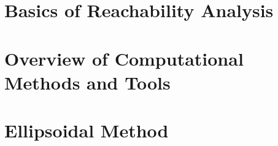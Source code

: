 \newcommand{\UX}{\underline{\XX}}
\newcommand{\OX}{\overline{\XX}}
\newcommand{\UXOL}{\underline{\XX}_{OL}}
\newcommand{\OXOL}{\overline{\XX}_{OL}}
\newcommand{\UXCL}{\underline{\XX}_{CL}}
\newcommand{\OXCL}{\overline{\XX}_{CL}}
\newcommand{\UY}{\underline{\YY}}
\newcommand{\OY}{\overline{\YY}}
\newcommand{\UYOL}{\underline{\YY}_{OL}}
\newcommand{\OYOL}{\overline{\YY}_{OL}}
\newcommand{\UYCL}{\underline{\YY}_{CL}}
\newcommand{\OYCL}{\overline{\YY}_{CL}}




\section{Basics of Reachability Analysis}\label{sec_reachproblem}



\section{Overview of Computational Methods and Tools}\label{sec_overview}


\section{Ellipsoidal Method}\label{sec_ellipsoidalmethod}



